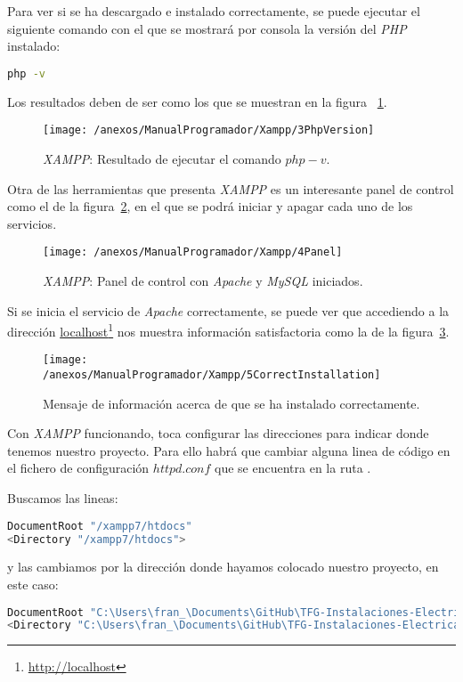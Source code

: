Para ver si se ha descargado e instalado correctamente, se puede ejecutar el siguiente comando con el que se mostrará por consola la versión del \textit{PHP} instalado:
\begin{lstlisting}[language=bash]
			php -v
\end{lstlisting}

Los resultados deben de ser como los que se muestran en la figura ~\ref{img:XAMPP_PHP_v}.

\begin{figure}[h]
	\centering
	\texttt{[image: /anexos/ManualProgramador/Xampp/3PhpVersion]}
	\caption{\textit{XAMPP}: Resultado de ejecutar el comando $php -v$.}
	\label{img:XAMPP_PHP_v}
\end{figure}

Otra de las herramientas que presenta \textit{XAMPP} es un interesante panel de control como el de la figura~\ref{img:XAMPP_Panel}, en el que se podrá iniciar y apagar cada uno de los servicios.

\begin{figure}[h]
	\centering
	\texttt{[image: /anexos/ManualProgramador/Xampp/4Panel]}
	\caption{\textit{XAMPP}: Panel de control con \textit{Apache} y \textit{MySQL} iniciados.}
	\label{img:XAMPP_Panel}
\end{figure}

Si se inicia el servicio de \textit{Apache} correctamente, se puede ver que accediendo a la dirección \href{http://localhost}{localhost}\footnote{\url{http://localhost}} nos muestra información satisfactoria como la de la figura~\ref{img:XAMPP_Correct}.

\begin{figure}[h]
	\centering
	\texttt{[image: /anexos/ManualProgramador/Xampp/5CorrectInstallation]}
	\caption{Mensaje de información acerca de que se ha instalado correctamente.}
	\label{img:XAMPP_Correct}
\end{figure}

Con \textit{XAMPP} funcionando, toca configurar las direcciones para indicar donde tenemos nuestro proyecto. Para ello habrá que cambiar alguna linea de código en el fichero de configuración $httpd.conf$ que se encuentra en la ruta \textit{}.

Buscamos las lineas: 
\begin{lstlisting}[language=bash]
DocumentRoot "/xampp7/htdocs"
<Directory "/xampp7/htdocs">
\end{lstlisting}
y las cambiamos por la dirección donde hayamos colocado nuestro proyecto, en este caso: 
\begin{lstlisting}[language=bash]
DocumentRoot "C:\Users\fran_\Documents\GitHub\TFG-Instalaciones-Electricas\web\instalaciones_electricas"
<Directory "C:\Users\fran_\Documents\GitHub\TFG-Instalaciones-Electricas\web\instalaciones_electricas">
\end{lstlisting}

